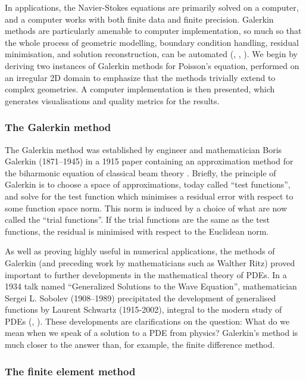 In applications, the Navier-Stokes equations are primarily
solved on a computer, and a computer works with both finite data and finite precision. Galerkin methods
are particularly amenable to computer implementation, so much so that the whole process of geometric modelling, boundary condition handling,
residual minimisation, and solution reconstruction, can be automated (\cite{firedrake}, \cite{fenics_book}, \cite{DOLFIN}). We begin by
deriving two instances of Galerkin methods for Poisson's equation, performed on an irregular 2D domain to emphasize that the methods trivially extend
to complex geometries. A computer implementation is then presented, which generates visualisations and quality metrics for the results.



\subsubsection{The Galerkin method}
The Galerkin method was established by engineer and mathematician Boris Galerkin (1871--1945) in a 1915 paper containing
an approximation method for the biharmonic equation of classical beam theory \cite{boris_galerkin}. Briefly, the principle of Galerkin is to
choose a space of approximations, today called ``test functions'', and solve for the test function which minimises a residual error with respect
to some function space norm. This norm is induced by a choice of what are now called the ``trial functions''. If the trial functions are the same as the test functions,
the residual is minimised with respect to the Euclidean norm.

As well as proving highly useful
in numerical applications, the methods of Galerkin (and preceding work by mathematicians such as Walther Ritz) proved important to further developments
in the mathematical theory of PDEs. In a 1934 talk named ``Generalized Solutions to the Wave Equation'', mathematician Sergei L. Sobolev (1908--1989)
precipitated the development
of generalised functions by Laurent Schwartz (1915-2002), integral to the modern study of PDEs
(\cite{sobolev_web_page}, \cite{one_hundred_years_galerkin}).
These developments are clarifications on the question: What do we mean when we speak of a solution to a PDE from physics? Galerkin's method
is much closer to the answer than, for example, the finite difference method.


\subsubsection{The finite element method}

